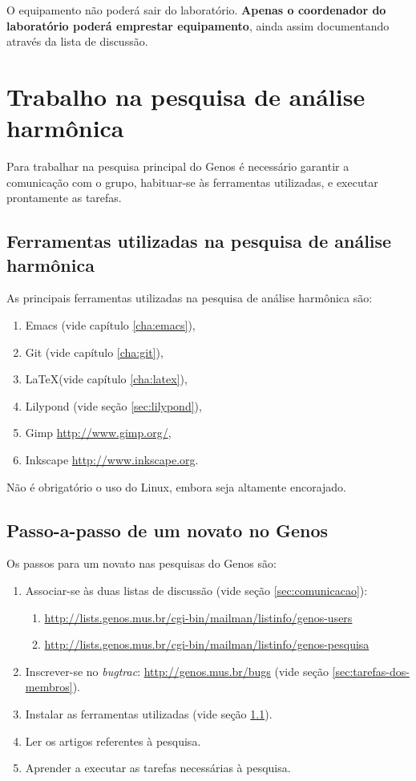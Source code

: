 \documentclass[12pt,brazil]{book}
\begin{document}
O equipamento não poderá sair do laboratório. \textbf{Apenas o
  coordenador do laboratório poderá emprestar equipamento}, ainda
assim documentando através da lista de discussão.

\section{Trabalho na pesquisa de análise harmônica}
\label{sec:trabalho-na-pesquisa}

Para trabalhar na pesquisa principal do Genos é necessário garantir a
comunicação com o grupo, habituar-se às ferramentas utilizadas, e
executar prontamente as tarefas.

\subsection{Ferramentas utilizadas na pesquisa de análise harmônica}
\label{sec:ferr-util-na}

As principais ferramentas utilizadas na pesquisa de análise harmônica
são:

\begin{enumerate}
\item Emacs (vide capítulo \ref{cha:emacs}),
\item Git (vide capítulo \ref{cha:git}),
\item \LaTeX (vide capítulo \ref{cha:latex}),
\item Lilypond (vide seção \ref{sec:lilypond}),
\item Gimp \url{http://www.gimp.org/},
\item Inkscape \url{http://www.inkscape.org}.
\end{enumerate}

Não é obrigatório o uso do Linux, embora seja altamente encorajado.

\subsection{Passo-a-passo de um novato no Genos}
\label{sec:passo-passo-de}

Os passos para um novato nas pesquisas do Genos são:

\begin{enumerate}
\item Associar-se às duas listas de discussão (vide seção
  \ref{sec:comunicacao}):
  \begin{enumerate}
  \item \url{http://lists.genos.mus.br/cgi-bin/mailman/listinfo/genos-users}
  \item \url{http://lists.genos.mus.br/cgi-bin/mailman/listinfo/genos-pesquisa}
  \end{enumerate}
\item Inscrever-se no \textit{bugtrac}: \url{http://genos.mus.br/bugs}
  (vide seção \ref{sec:tarefas-dos-membros}).
\item Instalar as ferramentas utilizadas (vide seção
  \ref{sec:ferr-util-na}).
\item Ler os artigos referentes à pesquisa.
\item Aprender a executar as tarefas necessárias à pesquisa.
\end{enumerate}
\end{document}
